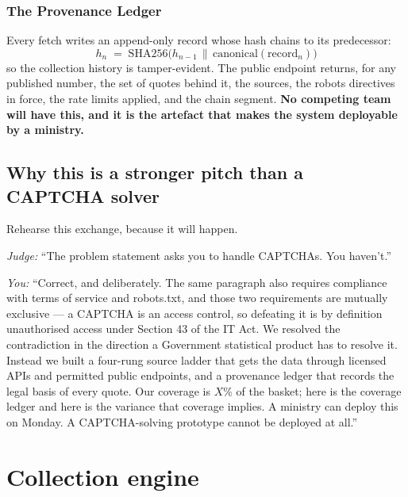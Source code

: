 \subsubsection{The Provenance Ledger}

Every fetch writes an append-only record whose hash chains to its predecessor:
\begin{equation}
h_n \;=\; \text{SHA256}\big(h_{n-1} \,\|\, \text{canonical}(\text{record}_n)\big)
\end{equation}
so the collection history is tamper-evident. The public 
endpoint returns, for any published number, the set of quotes behind it, the sources, the
robots directives in force, the rate limits applied, and the chain segment. \textbf{No
competing team will have this, and it is the artefact that makes the system deployable by a
ministry.}

\subsection{Why this is a stronger pitch than a CAPTCHA solver}

\begin{keybox}
Rehearse this exchange, because it will happen.\par\vspace{4pt}
\emph{Judge:} ``The problem statement asks you to handle CAPTCHAs. You haven't.''\par\vspace{3pt}
\emph{You:} ``Correct, and deliberately. The same paragraph also requires compliance with
terms of service and robots.txt, and those two requirements are mutually exclusive --- a
CAPTCHA is an access control, so defeating it is by definition unauthorised access under
Section 43 of the IT Act. We resolved the contradiction in the direction a Government
statistical product has to resolve it. Instead we built a four-rung source ladder that gets
the data through licensed APIs and permitted public endpoints, and a provenance ledger that
records the legal basis of every quote. Our coverage is $X\%$ of the basket; here is the
coverage ledger and here is the variance that coverage implies. A ministry can deploy this
on Monday. A CAPTCHA-solving prototype cannot be deployed at all.''
\end{keybox}

\section{Collection engine}

